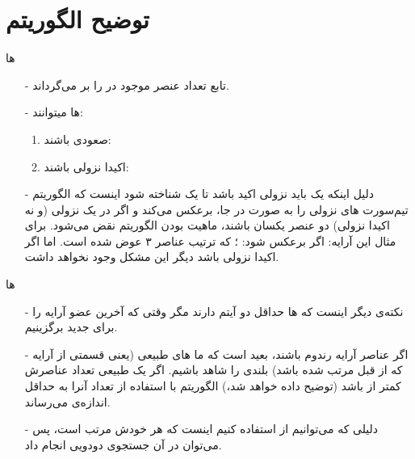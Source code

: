 \section{توضیح الگوریتم}
\begin{frame}{ها}
\begin{itemize}\itemr
\item[-]
تابع 
تعداد عنصر موجود در  را بر می‌گرداند.

\item[-]
ها
میتوانند:
\begin{enumerate}\itemr
\item
صعودی باشند:

\item 
اکیدا نزولی باشند:
\end{enumerate}
\item[-]
دلیل اینکه یک  باید نزولی اکید باشد تا یک  شناخته شود اینست که الگوریتم تیم‌سورت ‌های نزولی را به صورت در جا، برعکس می‌کند و اگر در یک  نزولی (و نه اکیدا نزولی) دو عنصر یکسان باشند، ماهیت  بودن الگوریتم نقض می‌شود. برای مثال این‌ آرایه: 
اگر برعکس شود:
؛ که ترتیب عناصر ۳ عوض شده است. اما اگر اکیدا نزولی باشد دیگر این مشکل وجود نخواهد داشت.
\end{itemize}
\end{frame}

\begin{frame}{ها}
\begin{itemize}\itemr
\item[-]
نکته‌ی دیگر اینست که ها حداقل دو آیتم دارند مگر وقتی که آخرین عضو آرایه را برای  جدید برگزینیم.
\item[-]
اگر عناصر آرایه رندوم باشند، بعید است که ما های طبیعی (یعنی قسمتی از آرایه که از قبل مرتب شده باشد) بلندی را شاهد باشیم. اگر یک  طبیعی تعداد عناصرش کمتر از  باشد (توضیح داده خواهد شد،) الگوریتم با استفاده از  تعداد آنرا به حداقل اندازه‌ی  می‌رساند.

\item[-]
دلیلی که می‌توانیم از  استفاده کنیم اینست که هر  خودش مرتب است، پس می‌توان در آن جستجوی دودویی انجام داد.
\end{itemize}
\end{frame}

